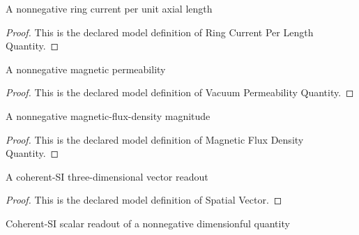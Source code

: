 \begin{definition}
  \label{def:physics:phyx-mini-0969:phyxminiproblems-problemphyxmini0969-ringcurrentperlengthquantity}
  A nonnegative ring current per unit axial length
\end{definition}
\begin{proof}
  This is the declared model definition of Ring Current Per Length Quantity.
\end{proof}
\begin{definition}
  \label{def:physics:phyx-mini-0969:phyxminiproblems-problemphyxmini0969-vacuumpermeabilityquantity}
  A nonnegative magnetic permeability
\end{definition}
\begin{proof}
  This is the declared model definition of Vacuum Permeability Quantity.
\end{proof}
\begin{definition}
  \label{def:physics:phyx-mini-0969:phyxminiproblems-problemphyxmini0969-magneticfluxdensityquantity}
  A nonnegative magnetic-flux-density magnitude
\end{definition}
\begin{proof}
  This is the declared model definition of Magnetic Flux Density Quantity.
\end{proof}
\begin{definition}
  \label{def:physics:phyx-mini-0969:phyxminiproblems-problemphyxmini0969-spatialvector}
  A coherent-SI three-dimensional vector readout
\end{definition}
\begin{proof}
  This is the declared model definition of Spatial Vector.
\end{proof}
\begin{definition}
  \label{def:physics:phyx-mini-0969:phyxminiproblems-problemphyxmini0969-coherentsireadout}
  Coherent-SI scalar readout of a nonnegative dimensionful quantity
\end{definition}
